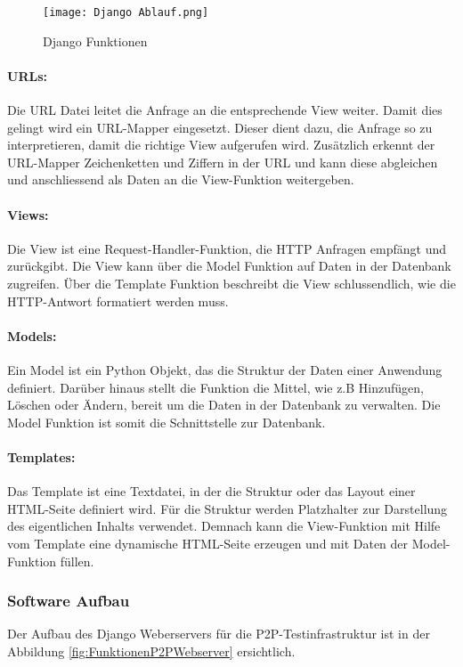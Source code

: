 \begin{figure} [H]
	\centering
	\texttt{[image: Django Ablauf.png]}
	\caption{Django Funktionen \cite{mdn_web_docs_django_2019}}
	\label{fig:DjangoAblauf}
\end{figure}

\paragraph{URLs:}\label{par:1URLs}
Die URL Datei leitet die Anfrage an die entsprechende View weiter. Damit dies gelingt wird ein URL-Mapper eingesetzt.
Dieser dient dazu, die Anfrage so zu interpretieren, damit die richtige View aufgerufen wird.
Zusätzlich erkennt der URL-Mapper Zeichenketten und Ziffern in der URL und kann diese abgleichen und anschliessend als Daten an die View-Funktion weitergeben.

\paragraph{Views:}\label{par:1Views}
Die View ist eine Request-Handler-Funktion, die HTTP Anfragen empfängt und zurückgibt.
Die View kann über die Model Funktion auf Daten in der Datenbank zugreifen.
Über die Template Funktion beschreibt die View schlussendlich, wie die HTTP-Antwort formatiert werden muss.

\paragraph{Models:}\label{par:1Models}
Ein Model ist ein Python Objekt, das die Struktur der Daten einer Anwendung definiert. Darüber hinaus stellt die Funktion die Mittel, wie z.B Hinzufügen, Löschen oder Ändern, bereit um die Daten in der Datenbank zu verwalten.
Die Model Funktion ist somit die Schnittstelle zur Datenbank.

\paragraph{Templates:}\label{par:1Templates}
Das Template ist eine Textdatei, in der die Struktur oder das Layout einer HTML-Seite definiert wird.
Für die Struktur werden Platzhalter zur Darstellung des eigentlichen Inhalts verwendet.
Demnach kann die View-Funktion mit Hilfe vom Template eine dynamische HTML-Seite erzeugen und mit Daten der Model-Funktion füllen.


\subsubsection{Software Aufbau}\label{subsubsec:SoftwareAufbau}
Der Aufbau des Django Weberservers für die P2P-Testinfrastruktur ist in der Abbildung \ref{fig:FunktionenP2PWebserver} ersichtlich.


